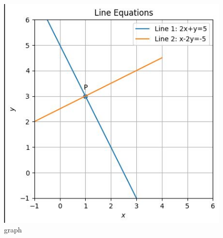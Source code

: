 \documentclass[12pt]{article}
\begin{document}
\begin{figure}[H]
    \centering
    \includegraphics[width=\columnwidth]{figs/graph.jpg}
    \caption{graph}
    \label{fig:}
\end{figure}
\end{document}
